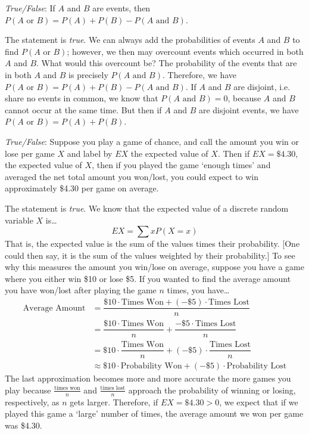 \documentclass[11pt,letterpaper]{article}
\begin{document}
\quizsol \textit{True/False}: If $A$ and $B$ are events, then $P(A \text{ or } B)= P(A) + P(B) - P(A \text{ and } B)$. \pspace

\sol The statement is \textit{true}. We can always add the probabilities of events $A$ and $B$ to find $P(A \text{ or } B)$; however, we then may overcount events which occurred in both $A$ and $B$. What would this overcount be? The probability of the events that are in both $A$ and $B$ is precisely $P(A \text{ and } B)$. Therefore, we have $P(A \text{ or } B)= P(A) + P(B) - P(A \text{ and } B)$. If $A$ and $B$ are disjoint, i.e. share no events in common, we know that $P(A \text{ and } B)= 0$, because $A$ and $B$ cannot occur at the same time. But then if $A$ and $B$ are disjoint events, we have $P(A \text{ or } B)= P(A) + P(B)$. \pvspace{1.5cm}



\quizsol \textit{True/False}: Suppose you play a game of chance, and call the amount you win or lose per game $X$ and label by $EX$ the expected value of $X$. Then if $EX= \$4.30$, the expected value of $X$, then if you played the game `enough times' and averaged the net total amount you won/lost, you could expect to win approximately \$4.30 per game on average. \pspace

\sol The statement is \textit{true}. We know that the expected value of a discrete random variable $X$ is\dots
	\[
	EX= \sum x P(X= x)
	\]
That is, the expected value is the sum of the values times their probability. [One could then say, it is the sum of the values weighted by their probability.] To see why this measures the amount you win/lose on average, suppose you have a game where you either win \$10 or lose \$5. If you wanted to find the average amount you have won/lost after playing the game $n$ times, you have\dots
	\[
	\begin{aligned}
	\text{Average Amount}&= \dfrac{\$10 \cdot \text{Times Won} + (-\$5) \cdot \text{Times Lost}}{n} \\
	&= \dfrac{\$10 \cdot \text{Times Won}}{n} + \dfrac{-\$5 \cdot \text{Times Lost}}{n} \\
	&= \$10 \cdot \dfrac{\text{Times Won}}{n} + (-\$5) \cdot \dfrac{\text{Times Lost}}{n} \\
	&\approx \$10 \cdot \text{Probability Won} + (-\$5) \cdot \text{Probability Lost}
	\end{aligned}
	\] 
The last approximation becomes more and more accurate the more games you play because $\frac{\text{times won}}{n}$ and $\frac{\text{times lost}}{n}$ approach the probability of winning or losing, respectively, as $n$ gets larger. Therefore, if $EX= \$4.30 > 0$, we expect that if we played this game a `large' number of times, the average amount we won per game was \$4.30. 
\end{document}
